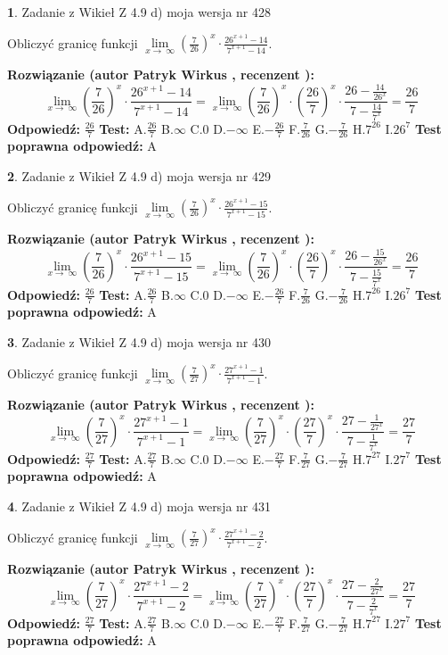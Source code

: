 \documentclass[12pt, a4paper]{article}
\theoremstyle{definition} %
\newtheorem{zad}{}
\newcommand{\zadStart}[1]{\begin{zad}#1\newline}
\newcommand{\zadStop}{\end{zad}}
\newcommand{\rozwStart}[2]{\noindent \textbf{Rozwiązanie (autor #1 , recenzent #2): }\newline}
\newcommand{\rozwStop}{\newline}
\newcommand{\odpStart}{\noindent \textbf{Odpowiedź:}\newline}
\newcommand{\odpStop}{\newline}
\newcommand{\testStart}{\noindent \textbf{Test:}\newline}
\newcommand{\testStop}{\newline}
\newcommand{\kluczStart}{\noindent \textbf{Test poprawna odpowiedź:}\newline}
\newcommand{\kluczStop}{\newline}
\begin{document}
\zadStart{Zadanie z Wikieł Z 4.9 d) moja wersja nr 428}


Obliczyć granicę funkcji  $\lim\limits_{x\to\ \infty}(\frac{7}{26})^{x}\cdot\frac{26^{x+1}-14}{7^{x+1}-14}$.
\zadStop
\rozwStart{Patryk Wirkus}{}
$$\lim\limits_{x\to\ \infty}(\frac{7}{26})^{x}\cdot\frac{26^{x+1}-14}{7^{x+1}-14}=\lim\limits_{x\to\ \infty}(\frac{7}{26})^{x}\cdot(\frac{26}{7})^{x} \cdot \frac{26-\frac{14}{26^{x}}}{7-\frac{14}{7^{x}}} = \frac{26}{7}$$
\rozwStop
\odpStart
$\frac{26}{7}$
\odpStop
\testStart
A.$\frac{26}{7}$ B.$\infty$ C.$0$ D.$-\infty$ E.$-\frac{26}{7}$
F.$\frac{7}{26}$ G.$-\frac{7}{26}$
H.$7^{26}$
I.$26^{7}$
\testStop
\kluczStart
A
\kluczStop



\zadStart{Zadanie z Wikieł Z 4.9 d) moja wersja nr 429}


Obliczyć granicę funkcji  $\lim\limits_{x\to\ \infty}(\frac{7}{26})^{x}\cdot\frac{26^{x+1}-15}{7^{x+1}-15}$.
\zadStop
\rozwStart{Patryk Wirkus}{}
$$\lim\limits_{x\to\ \infty}(\frac{7}{26})^{x}\cdot\frac{26^{x+1}-15}{7^{x+1}-15}=\lim\limits_{x\to\ \infty}(\frac{7}{26})^{x}\cdot(\frac{26}{7})^{x} \cdot \frac{26-\frac{15}{26^{x}}}{7-\frac{15}{7^{x}}} = \frac{26}{7}$$
\rozwStop
\odpStart
$\frac{26}{7}$
\odpStop
\testStart
A.$\frac{26}{7}$ B.$\infty$ C.$0$ D.$-\infty$ E.$-\frac{26}{7}$
F.$\frac{7}{26}$ G.$-\frac{7}{26}$
H.$7^{26}$
I.$26^{7}$
\testStop
\kluczStart
A
\kluczStop



\zadStart{Zadanie z Wikieł Z 4.9 d) moja wersja nr 430}


Obliczyć granicę funkcji  $\lim\limits_{x\to\ \infty}(\frac{7}{27})^{x}\cdot\frac{27^{x+1}-1}{7^{x+1}-1}$.
\zadStop
\rozwStart{Patryk Wirkus}{}
$$\lim\limits_{x\to\ \infty}(\frac{7}{27})^{x}\cdot\frac{27^{x+1}-1}{7^{x+1}-1}=\lim\limits_{x\to\ \infty}(\frac{7}{27})^{x}\cdot(\frac{27}{7})^{x} \cdot \frac{27-\frac{1}{27^{x}}}{7-\frac{1}{7^{x}}} = \frac{27}{7}$$
\rozwStop
\odpStart
$\frac{27}{7}$
\odpStop
\testStart
A.$\frac{27}{7}$ B.$\infty$ C.$0$ D.$-\infty$ E.$-\frac{27}{7}$
F.$\frac{7}{27}$ G.$-\frac{7}{27}$
H.$7^{27}$
I.$27^{7}$
\testStop
\kluczStart
A
\kluczStop



\zadStart{Zadanie z Wikieł Z 4.9 d) moja wersja nr 431}


Obliczyć granicę funkcji  $\lim\limits_{x\to\ \infty}(\frac{7}{27})^{x}\cdot\frac{27^{x+1}-2}{7^{x+1}-2}$.
\zadStop
\rozwStart{Patryk Wirkus}{}
$$\lim\limits_{x\to\ \infty}(\frac{7}{27})^{x}\cdot\frac{27^{x+1}-2}{7^{x+1}-2}=\lim\limits_{x\to\ \infty}(\frac{7}{27})^{x}\cdot(\frac{27}{7})^{x} \cdot \frac{27-\frac{2}{27^{x}}}{7-\frac{2}{7^{x}}} = \frac{27}{7}$$
\rozwStop
\odpStart
$\frac{27}{7}$
\odpStop
\testStart
A.$\frac{27}{7}$ B.$\infty$ C.$0$ D.$-\infty$ E.$-\frac{27}{7}$
F.$\frac{7}{27}$ G.$-\frac{7}{27}$
H.$7^{27}$
I.$27^{7}$
\testStop
\kluczStart
A
\kluczStop
\end{document}
